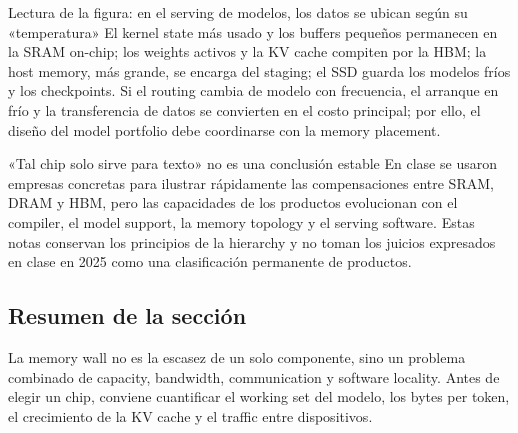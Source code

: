 
\begin{knowledgebox}{Lectura de la figura: en el serving de modelos, los datos se ubican según su «temperatura»}
El kernel state más usado y los buffers pequeños permanecen en la SRAM on-chip; los weights activos y la KV cache compiten por la HBM; la host memory, más grande, se encarga del staging; el SSD guarda los modelos fríos y los checkpoints. Si el routing cambia de modelo con frecuencia, el arranque en frío y la transferencia de datos se convierten en el costo principal; por ello, el diseño del model portfolio debe coordinarse con la memory placement.
\end{knowledgebox}

\begin{warningbox}{«Tal chip solo sirve para texto» no es una conclusión estable}
En clase se usaron empresas concretas para ilustrar rápidamente las compensaciones entre SRAM, DRAM y HBM, pero las capacidades de los productos evolucionan con el compiler, el model support, la memory topology y el serving software. Estas notas conservan los principios de la hierarchy y no toman los juicios expresados en clase en 2025 como una clasificación permanente de productos.
\end{warningbox}

\subsection{Resumen de la sección}

La memory wall no es la escasez de un solo componente, sino un problema combinado de capacity, bandwidth, communication y software locality. Antes de elegir un chip, conviene cuantificar el working set del modelo, los bytes per token, el crecimiento de la KV cache y el traffic entre dispositivos.
